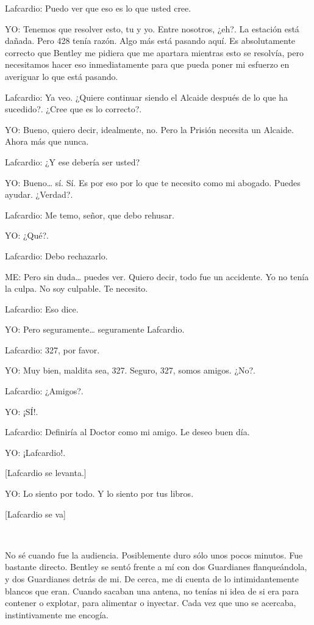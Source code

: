 Lafcardio: Puedo ver que eso es lo que usted cree.

YO: Tenemos que resolver esto, tu y yo. Entre nosotros, ¿eh?. La
estación está dañada. Pero 428 tenía razón. Algo más está pasando aquí.
Es absolutamente correcto que Bentley me pidiera que me apartara
mientras esto se resolvía, pero necesitamos hacer eso inmediatamente
para que pueda poner mi esfuerzo en averiguar lo que está pasando.

Lafcardio: Ya veo. ¿Quiere continuar siendo el Alcaide después de lo que
ha sucedido?. ¿Cree que es lo correcto?.

YO: Bueno, quiero decir, idealmente, no. Pero la Prisión necesita un
Alcaide. Ahora más que nunca.

Lafcardio: ¿Y ese debería ser usted?

YO: Bueno\ldots{} sí. Sí. Es por eso por lo que te necesito como mi
abogado. Puedes ayudar. ¿Verdad?.

Lafcardio: Me temo, señor, que debo rehusar.

YO: ¿Qué?.

Lafcardio: Debo rechazarlo.

ME: Pero sin duda\ldots{} puedes ver. Quiero decir, todo fue un
accidente. Yo no tenía la culpa. No soy culpable. Te necesito.

Lafcardio: Eso dice.

YO: Pero seguramente\ldots{} seguramente Lafcardio.

Lafcardio: 327, por favor.

YO: Muy bien, maldita sea, 327. Seguro, 327, somos amigos. ¿No?.

Lafcardio: ¿Amigos?.

YO: ¡SÍ!.

Lafcardio: Definiría al Doctor como mi amigo. Le deseo buen día.

YO: ¡Lafcardio!.

{[}Lafcardio se levanta.{]}

YO: Lo siento por todo. Y lo siento por tus libros.

{[}Lafcardio se va{]}

~

No sé cuando fue la audiencia. Posiblemente duro sólo unos pocos
minutos. Fue bastante directo. Bentley se sentó frente a mí con dos
Guardianes flanqueándola, y dos Guardianes detrás de mi. De cerca, me di
cuenta de lo intimidantemente blancos que eran. Cuando sacaban una
antena, no tenías ni idea de si era para contener o explotar, para
alimentar o inyectar. Cada vez que uno se acercaba, instintivamente me
encogía.

